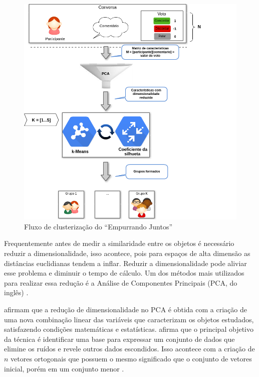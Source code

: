     
    \begin{figure}[h!]
      \centering
      \includegraphics[scale=0.6]{figuras/resumo_clusterizao_ej.png}
      \caption{Fluxo de clusterização do ``Empurrando Juntos''}
      \label{fig:resumo_clusterizao_ej}
    \end{figure}
  

    Frequentemente antes de medir a similaridade entre os objetos é necessário
    reduzir a dimensionalidade, isso acontece, pois para espaços de alta dimensão as distâncias euclidianas
    tendem a inflar. Reduzir a dimensionalidade pode aliviar esse problema e diminuir o tempo de cálculo.
    Um dos métodos mais utilizados para realizar essa redução é a Análise de 
    Componentes Principais (PCA, do inglês) \cite{han2011data, sklearn}.

     afirmam que a redução de dimensionalidade no PCA é
    obtida com a criação de uma nova combinação linear das variáveis que caracterizam os
    objetos estudados, satisfazendo condições matemáticas e estatísticas.
     afirma que o principal objetivo da técnica é identificar
    uma base para expressar um conjunto de dados que elimine os ruídos e revele 
    outros dados escondidos. Isso acontece com a criação de $n$ vetores ortogonais que possuem o mesmo significado que o conjunto
    de vetores inicial, porém em um conjunto menor \cite{han2011data}. 
    
